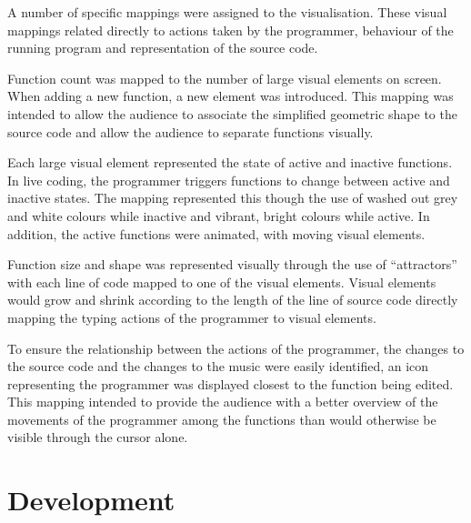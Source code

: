 A number of specific mappings were assigned to the visualisation. These visual mappings related directly to actions taken by the programmer, behaviour of the running program and representation of the source code. 

Function count was mapped to the number of large visual elements on screen. When adding a new function, a new element was introduced. This mapping was intended to allow the audience to associate the simplified geometric shape to the source code and allow the audience to separate functions visually.

Each large visual element represented the state of active and inactive functions. In live coding, the programmer triggers functions to change between active and inactive states. The mapping represented this though the use of washed out grey and white colours while inactive and vibrant, bright colours while active. In addition, the active functions were animated, with moving visual elements.

Function size and shape was represented visually through the use of ``attractors'' with each line of code mapped to one of the visual elements. Visual elements would grow and shrink according to the length of the line of source code directly mapping the typing actions of the programmer to visual elements.  


To ensure the relationship between the actions of the programmer, the changes to the source code and the changes to the music were easily identified, an icon representing the programmer was displayed closest to the function being edited. This mapping intended to provide the audience with a better overview of the movements of the programmer among the functions than would otherwise be visible through the cursor alone.  





\section{Development}

